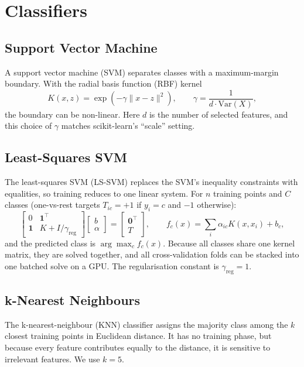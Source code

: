 \documentclass[12pt,a4paper]{report}
\begin{document}
\section{Classifiers}
\subsection{Support Vector Machine}
A support vector machine (SVM) separates classes with a maximum-margin boundary. With the radial basis function (RBF)
kernel
\begin{equation}
K(x, z) = \exp\!\left(-\gamma \lVert x - z \rVert^2\right), \qquad \gamma = \frac{1}{d \cdot \mathrm{Var}(X)},
\end{equation}
the boundary can be non-linear. Here $d$ is the number of selected features, and this choice of $\gamma$ matches
scikit-learn's ``scale'' setting.

\subsection{Least-Squares SVM}
The least-squares SVM (LS-SVM) \cite{suykens1999} replaces the SVM's inequality constraints with equalities, so
training reduces to one linear system. For $n$ training points and $C$ classes (one-vs-rest targets
$T_{ic} = +1$ if $y_i = c$ and $-1$ otherwise):
\begin{equation}
\begin{bmatrix} 0 & \mathbf{1}^{\top} \\ \mathbf{1} & K + I/\gamma_{\mathrm{reg}} \end{bmatrix}
\begin{bmatrix} b \\ \alpha \end{bmatrix} =
\begin{bmatrix} \mathbf{0}^{\top} \\ T \end{bmatrix},
\qquad f_c(x) = \sum_i \alpha_{ic} K(x, x_i) + b_c ,
\end{equation}
and the predicted class is $\arg\max_c f_c(x)$. Because all classes share one kernel matrix, they are solved
together, and all cross-validation folds can be stacked into one batched solve on a GPU. The regularisation constant
is $\gamma_{\mathrm{reg}} = 1$.

\subsection{k-Nearest Neighbours}
The k-nearest-neighbour (KNN) classifier assigns the majority class among the $k$ closest training points in
Euclidean distance. It has no training phase, but because every feature contributes equally to the distance, it is
sensitive to irrelevant features. We use $k = 5$.
\end{document}
